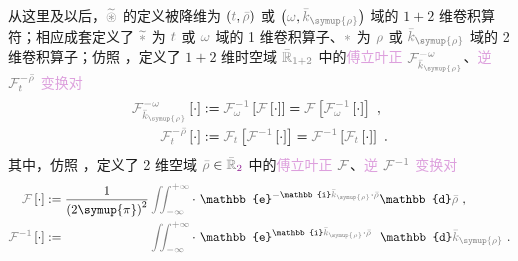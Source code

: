 从这里及以后，$\mathcolor{gray}{\widetilde \circledast}$ 的定义被降维为 $\left( \mathcolor{gray}{t}, \mathcolor{gray}{\bar{\rho}} \right)$ 或 $\left( \mathcolor{gray}{\omega}, \mathcolor{gray}{\bar{k}_{\symup{\rho}}} \right)$ 域的 $1+2$ 维卷积算符；相应成套定义了 $\mathcolor{gray}{\widetilde *}$ 为 $\mathcolor{gray}{t}$ 或 $\mathcolor{gray}{\omega}$ 域的 1 维卷积算子、$\mathcolor{gray}{*}$ 为 $\mathcolor{gray}{\rho}$ 或 $\mathcolor{gray}{\bar{k}_{\symup{\rho}}}$ 域的 2 维卷积算子；仿照 ，定义了 $1+2$ 维时空域 $\mathcolor{gray}{\bar{\mathbb{R}}_{1+2}}$ 中的\textcolor{Plum}{傅立叶正} $\mathcolor{gray}{\mathcal F_{\bar{k}_{\symup{\rho}}}^{-\omega}}$、\textcolor{Plum}{逆} $\mathcolor{gray}{\mathcal F^{-\bar{\rho}}_{t}}$ \textcolor{Plum}{变换对}
\begin{subequations} \label{eq:FT-trho_wkrho}
	\abovedisplayskip=4pt
	\belowdisplayskip=6pt
\begin{align}
	\mathcolor{gray}{\mathcal F_{\bar{k}_{\symup{\rho}}}^{-\omega}} \left[ \cdot \right] &:= \mathcolor{gray}{\mathcal F_{\omega}^{-1}} \left[ \mathcolor{gray}{\mathcal F} \left[ \cdot \right] \right] = \mathcolor{gray}{\mathcal F} \left[ \mathcolor{gray}{\mathcal F_{\omega}^{-1}} \left[ \cdot \right] \right] ~, \label{eq:FT-wkrho} \\
	\mathcolor{gray}{\mathcal F^{-\bar{\rho}}_{t}} \left[ \cdot \right] &:= \mathcolor{gray}{\mathcal F_{t}} \left[ \mathcolor{gray}{\mathcal F^{-1}} \left[ \cdot \right] \right] = \mathcolor{gray}{\mathcal F^{-1}} \left[ \mathcolor{gray}{\mathcal F_{t}} \left[ \cdot \right] \right] ~. \label{eq:IFT-trho}
\end{align}
\end{subequations}
其中，仿照 ，定义了 2 维空域 $\mathcolor{gray}{\bar{\rho}} \in \mathcolor{gray}{\bar{\mathbb{R}}_{\textcolor{Plum}{2}}}$ 中的\textcolor{Plum}{傅立叶正} $\mathcolor{gray}{\mathcal F}$、\textcolor{Plum}{逆} $\mathcolor{gray}{\mathcal F^{-1}}$ \textcolor{Plum}{变换对}
\begin{subequations} \label{eq:FT-rho_krho}
	\belowdisplayskip=8pt
\begin{align}
	\mathcolor{gray}{\mathcal F} \left[ \cdot \right] &:= \frac{ 1 }{ \left( 2\symup{\pi} \right)^2 } \mathcolor{gray}{\iint_{-\infty}^{+\infty}} \cdot~ \mathbb{e}^{-\mathbb{i}\mathcolor{gray}{\bar{k}_{\symup{\rho}}} \cdot \mathcolor{gray}{\bar{\rho}}} \mathbb{d}\mathcolor{gray}{\bar{\rho}} ~, \label{eq:FT-krho} \\
	\mathcolor{gray}{\mathcal F^{-1}} \left[ \cdot \right] &:= \hphantom{\frac{ 1 }{ \left( 2\symup{\pi} \right)^3 }} \mathcolor{gray}{\iint_{-\infty}^{+\infty}} \cdot~ \mathbb{e}^{\mathbb{i}\mathcolor{gray}{\bar{k}_{\symup{\rho}}} \cdot \mathcolor{gray}{\bar{\rho}}} \hphantom{^-} \mathbb{d}\mathcolor{gray}{\bar{k}_{\symup{\rho}}} ~. \label{eq:IFT-rho}
\end{align}
\end{subequations}

